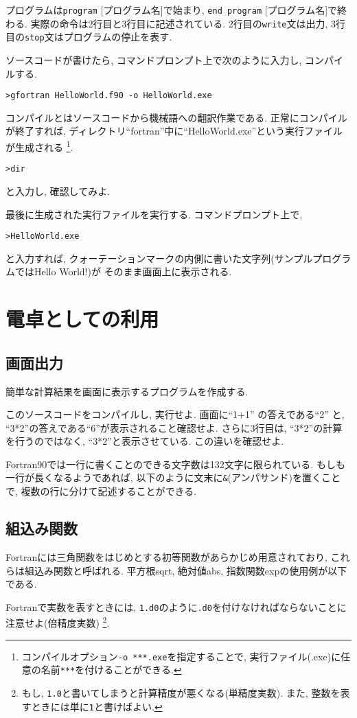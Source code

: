 プログラムは\verb|program| [プログラム名]で始まり, \verb|end program| [プログラム名]で終わる.
実際の命令は2行目と3行目に記述されている.
2行目の\verb|write|文は出力, 3行目の\verb|stop|文はプログラムの停止を表す.


ソースコードが書けたら, コマンドプロンプト上で次のように入力し, コンパイルする.
\begin{Verbatim}[frame=single]
>gfortran HelloWorld.f90 -o HelloWorld.exe
\end{Verbatim}
コンパイルとはソースコードから機械語への翻訳作業である.
正常にコンパイルが終了すれば, ディレクトリ``fortran''中に``HelloWorld.exe''という実行ファイルが生成される
\footnote{コンパイルオプション\verb|-o ***.exe|を指定することで, 実行ファイル(.exe)に任意の名前\verb|***|を付けることができる. }.
\begin{Verbatim}[frame=single]
>dir
\end{Verbatim}
と入力し, 確認してみよ.

最後に生成された実行ファイルを実行する. コマンドプロンプト上で,
\begin{Verbatim}[frame=single]
>HelloWorld.exe
\end{Verbatim}
と入力すれば, クォーテーションマークの内側に書いた文字列(サンプルプログラムではHello World!)が
そのまま画面上に表示される.

\section{電卓としての利用}
\subsection*{画面出力}
簡単な計算結果を画面に表示するプログラムを作成する. 

このソースコードをコンパイルし, 実行せよ. 
画面に``1+1'' の答えである``2'' と, ``3*2''の答えである``6''が表示されること確認せよ. 
さらに3行目は, ``3*2''の計算を行うのではなく, ``3*2''と表示させている. この違いを確認せよ. 

Fortran90では一行に書くことのできる文字数は132文字に限られている. 
もしも一行が長くなるようであれば, 以下のように文末に\verb|&|(アンパサンド)を置くことで, 
複数の行に分けて記述することができる. 



\subsection*{組込み関数}
Fortranには三角関数をはじめとする初等関数があらかじめ用意されており,
これらは組込み関数と呼ばれる.
平方根{\ttfamily sqrt}, 絶対値{\ttfamily abs}, 指数関数{\ttfamily exp}の使用例が以下である.

Fortranで実数を表すときには, \verb|1.d0|のように\verb|.d0|を付けなければならないことに注意せよ(倍精度実数)
\footnote{もし, \verb|1.0|と書いてしまうと計算精度が悪くなる(単精度実数). 
また, 整数を表すときには単に\verb|1|と書けばよい. }. 


